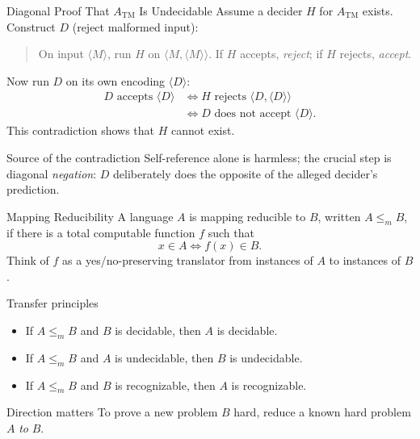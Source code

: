 \documentclass[10pt]{beamer}
\newcommand{\ATM}{A_{\mathrm{TM}}}
\begin{document}
\begin{frame}{Diagonal Proof That $\ATM$ Is Undecidable}
  Assume a decider $H$ for $\ATM$ exists. Construct $D$ (reject malformed input):
  \begin{quote}
    On input $\langle M\rangle$, run $H$ on $\langle M,\langle M\rangle\rangle$.
    If $H$ accepts, \emph{reject}; if $H$ rejects, \emph{accept}.
  \end{quote}
  Now run $D$ on its own encoding $\langle D\rangle$:
  \begin{align*}
    D\text{ accepts }\langle D\rangle
      &\iff H\text{ rejects }\langle D,\langle D\rangle\rangle\\
      &\iff D\text{ does not accept }\langle D\rangle.
  \end{align*}
  This contradiction shows that $H$ cannot exist.
  \begin{block}{Source of the contradiction}
    Self-reference alone is harmless; the crucial step is diagonal \emph{negation}: $D$ deliberately
    does the opposite of the alleged decider's prediction.
  \end{block}
\end{frame}

\begin{frame}{Mapping Reducibility}
  A language $A$ is mapping reducible to $B$, written $A\le_m B$, if there is a total computable
  function $f$ such that
  \[
    x\in A\iff f(x)\in B.
  \]
  Think of $f$ as a yes/no-preserving translator from instances of $A$ to instances of $B$.
  \begin{block}{Transfer principles}
    \begin{itemize}
      \item If $A\le_m B$ and $B$ is decidable, then $A$ is decidable.
      \item If $A\le_m B$ and $A$ is undecidable, then $B$ is undecidable.
      \item If $A\le_m B$ and $B$ is recognizable, then $A$ is recognizable.
    \end{itemize}
  \end{block}
  \begin{alertblock}{Direction matters}
    To prove a new problem $B$ hard, reduce a known hard problem $A$ \emph{to} $B$.
  \end{alertblock}
\end{frame}
\end{document}
